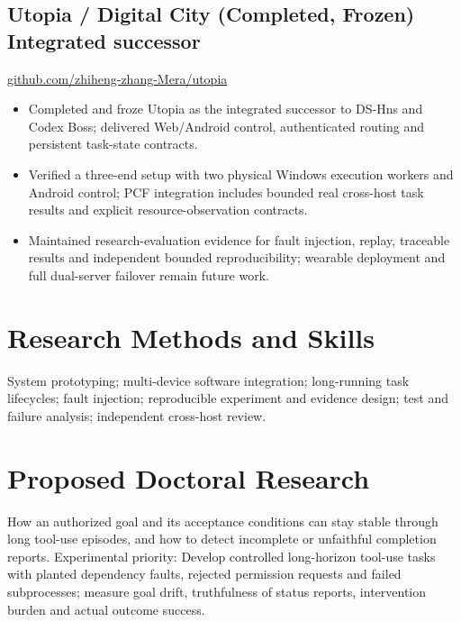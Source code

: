 \documentclass[10pt,a4paper]{article}
\begin{document}
\subsection*{Utopia / Digital City (Completed, Frozen) \hfill \small Integrated successor}
\href{https://github.com/zhiheng-zhang-Mera/utopia}{github.com/zhiheng-zhang-Mera/utopia}
\begin{itemize}
\item Completed and froze Utopia as the integrated successor to DS-Hns and Codex Boss; delivered Web/Android control, authenticated routing and persistent task-state contracts.
\item Verified a three-end setup with two physical Windows execution workers and Android control; PCF integration includes bounded real cross-host task results and explicit resource-observation contracts.
\item Maintained research-evaluation evidence for fault injection, replay, traceable results and independent bounded reproducibility; wearable deployment and full dual-server failover remain future work.
\end{itemize}

\section{Research Methods and Skills}
System prototyping; multi-device software integration; long-running task lifecycles; fault injection; reproducible experiment and evidence design; test and failure analysis; independent cross-host review.

\section{Proposed Doctoral Research}
How an authorized goal and its acceptance conditions can stay stable through long tool-use episodes, and how to detect incomplete or unfaithful completion reports. Experimental priority: Develop controlled long-horizon tool-use tasks with planted dependency faults, rejected permission requests and failed subprocesses; measure goal drift, truthfulness of status reports, intervention burden and actual outcome success.

\par\smallskip{}
\end{document}

